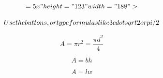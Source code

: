 \[= 5x" height="123" width="188">\]

\[Use the buttons, or type formulas like 3\\cdot \\sqrt{2} or pi/2\]

\[\begin{equation} A = \pi r^2 = \frac{\pi d^2}{4} \end{equation}\]

\[\begin{equation} A = b h \end{equation}\]

\[\begin{equation} A = l w \end{equation}\]

